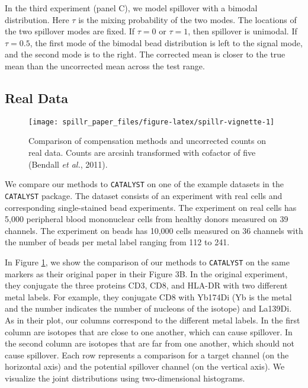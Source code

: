 \documentclass{bioinfo}
\begin{document}
In the third experiment (panel C), we model spillover with a bimodal
distribution. Here \(\tau\) is the mixing probability of the two modes.
The locations of the two spillover modes are fixed. If \(\tau = 0\) or
\(\tau = 1\), then spillover is unimodal. If \(\tau = 0.5\), the first
mode of the bimodal bead distribution is left to the signal mode, and
the second mode is to the right. The corrected mean is closer to the
true mean than the uncorrected mean across the test range.

\subsection{Real Data}

\label{real-data}

\begin{figure}

{\centering \texttt{[image: spillr\_paper\_files/figure-latex/spillr-vignette-1]} 

}

\caption{Comparison of compensation methods and uncorrected counts on real data. Counts are arcsinh transformed with cofactor of five (Bendall \emph{et al.}, 2011).}\label{fig:spillr-vignette}
\end{figure}

We compare our methods to \texttt{CATALYST} on one of the example
datasets in the \texttt{CATALYST} package. The dataset consists of an
experiment with real cells and corresponding single-stained bead
experiments. The experiment on real cells has 5,000 peripheral blood
mononuclear cells from healthy donors measured on 39 channels. The
experiment on beads has 10,000 cells measured on 36 channels with the
number of beads per metal label ranging from 112 to 241.

In Figure \ref{fig:spillr-vignette}, we show the comparison of our
methods to \texttt{CATALYST} on the same markers as their original paper
\citep{catalyst} in their Figure 3B. In the original experiment, they
conjugate the three proteins CD3, CD8, and HLA-DR with two different
metal labels. For example, they conjugate CD8 with Yb174Di (Yb is the
metal and the number indicates the number of nucleons of the isotope)
and La139Di. As in their plot, our columns correspond to the different
metal labels. In the first column are isotopes that are close to one
another, which can cause spillover. In the second column are isotopes
that are far from one another, which should not cause spillover. Each
row represents a comparison for a target channel (on the horizontal
axis) and the potential spillover channel (on the vertical axis). We
visualize the joint distributions using two-dimensional histograms.
\end{document}
